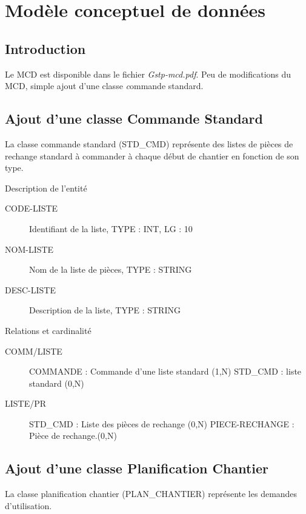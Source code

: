 \section{Modèle conceptuel de données}

\subsection{Introduction}
Le MCD est disponible dans le fichier {\sl Gstp-mcd.pdf}.
Peu de modifications du MCD, simple ajout d'une classe {\emph commande standard}.


\subsection{Ajout d'une classe Commande Standard}

La classe commande standard (STD\_CMD) représente des listes de pièces de 
rechange standard à commander à chaque début de chantier en fonction de son type.

\par{Description de l'entité}
\begin{description}
    \item[CODE-LISTE] Identifiant de la liste, TYPE : INT, LG : 10
    \item[NOM-LISTE] Nom de la liste de pièces, TYPE : STRING
    \item[DESC-LISTE] Description de la liste, TYPE : STRING
\end{description}

\par{Relations et cardinalité}
\begin{description}
    \item[COMM/LISTE]\el
         COMMANDE : Commande d'une liste standard (1,N)\el
        STD\_CMD : liste standard (0,N)
    \item[LISTE/PR]\el
         STD\_CMD : Liste des pièces de rechange (0,N)\el
        PIECE-RECHANGE :  Pièce de rechange.(0,N)
\end{description}

\subsection{Ajout d'une classe Planification Chantier}

La classe planification chantier (PLAN\_CHANTIER) représente les demandes
d'utilisation.

